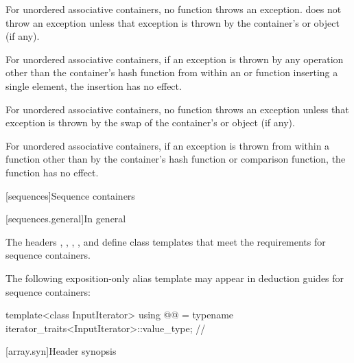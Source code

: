 \pnum
{}%
%
For unordered associative containers, no  function
throws an exception.  does not throw an
exception unless that exception is thrown by the container's  or
 object (if any).

\pnum
For unordered associative containers, if an exception is thrown by any
operation other than the container's hash function from within an
 or  function inserting a single element,
the insertion has no effect.

\pnum
For unordered associative containers, no  function throws
an exception unless that exception is thrown by the swap of the container's
 or  object (if any).

\pnum
{}%
%
For unordered associative containers, if an exception is thrown
from within a  function other than by the container's hash
function or comparison function, the  function has no effect.

[sequences]{Sequence containers}

[sequences.general]{In general}

\pnum
The headers , , ,
, and  define class templates that meet the
requirements for sequence containers.

\pnum
The following exposition-only alias template may appear in deduction guides for sequence containers:

\begin{codeblock}
template<class InputIterator>
  using @@ = typename iterator_traits<InputIterator>::value_type;  // \expos
\end{codeblock}

[array.syn]{Header  synopsis}

